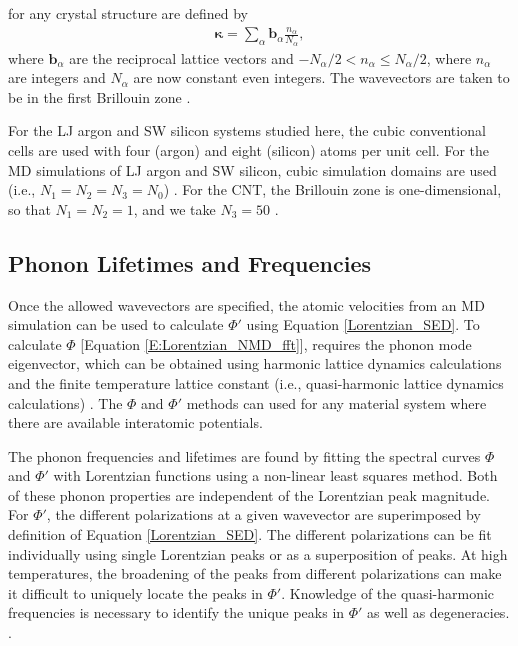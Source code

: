 for any crystal 
structure are defined by
\begin{equation}\label{crys_pos3}
\begin{split}
\pmb{\kappa} = \sum_{\alpha} \mathbf{b}_{\alpha} 
\frac{n_{\alpha}}{N_{\alpha}},
\end{split}
\end{equation}
where $\mathbf{b}_{\alpha}$ are the reciprocal lattice vectors and 
$-N_{\alpha}/2 < 
n_{\alpha} \leq N_{\alpha}/2$, where $n_{\alpha}$ are integers and 
$N_{\alpha}$ are now 
constant even integers. The wavevectors are taken to be in the first 
Brillouin zone 
\cite{ashcroft_solid_1976}.

For the LJ argon and SW silicon systems studied here, the cubic 
conventional cells are 
used with four (argon) and eight (silicon) atoms per unit cell. For the 
MD simulations of
 LJ argon and SW silicon, cubic simulation domains are used (i.e., 
 $N_1 = N_2 = N_3 = N_0$) 
\cite{mcgaughey_quantitative_2004,turney_predicting_2009,
sellan_size_2010}. For the CNT, the Brillouin 
zone is one-dimensional, 
so that $N_1 = N_2 = 1$, and we take $N_3=50$ 
\cite{thomas_predicting_2010}.


\subsection{\label{Subsection_Comp_Details_2}Phonon Lifetimes and 
Frequencies}
Once the allowed wavevectors are specified, the atomic velocities from 
an MD simulation can be used to calculate $\Phi'$ using Equation 
\eqref{Lorentzian_SED}. To calculate $\Phi$ 
[Equation \eqref{E:Lorentzian_NMD_fft}], 
requires the phonon mode eigenvector, which can be obtained using 
harmonic lattice dynamics calculations and the finite temperature 
lattice constant (i.e., quasi-harmonic lattice dynamics calculations) 
\cite{dove_introduction_1993,gale_general_2003}. 
The $\Phi$ and $\Phi'$ methods can used 
for any material system where there are 
available interatomic potentials.

The phonon frequencies and lifetimes are found by fitting the spectral 
curves $\Phi$ and $\Phi'$ with Lorentzian functions using a non-linear 
least squares method. Both of these 
phonon properties are independent of the Lorentzian peak magnitude. 
For $\Phi'$, the different polarizations at a given wavevector are 
superimposed by definition of Equation \eqref{Lorentzian_SED}. 
The different polarizations can be fit individually using single 
Lorentzian peaks or as a superposition of peaks. At high temperatures, 
the broadening of the peaks from different polarizations can make it 
difficult to uniquely locate the peaks in $\Phi'$. Knowledge of the 
quasi-harmonic frequencies is necessary to identify the unique peaks in 
$\Phi'$ as well as degeneracies.
\cite{mcgaughey_phonon_2006,turney_predicting_2009}.

